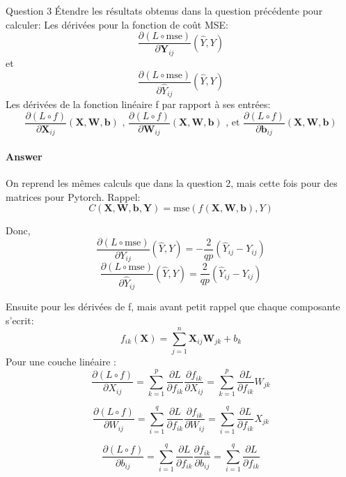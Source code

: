 \documentclass[12pt,a4paper]{article}
\begin{document}
\begin{section}{Question 3}
Étendre les résultats obtenus dans la question précédente pour calculer: \newline
Les dérivées pour la fonction de coût MSE:
\[
\frac{\partial (L\circ \text{mse})}{\partial \mathbf{Y}_{ij}}(\hat{Y}, Y)
\]
et
\[\frac{\partial (L\circ \text{mse})}{\partial \hat{Y}_{ij}}(\hat{Y}, Y)\]
Les dérivées de la fonction linéaire f par rapport à ses entrées:
\[
\frac{\partial (L\circ f)}{\partial \mathbf{X}_{ij}}(\mathbf{X}, \mathbf{W}, \mathbf{b}) \text{ , }
\frac{\partial (L\circ f)}{\partial \mathbf{W}_{ij}}(\mathbf{X}, \mathbf{W}, \mathbf{b}) \text{ , et }
\frac{\partial (L\circ f)}{\partial \mathbf{b}_{ij}}(\mathbf{X}, \mathbf{W}, \mathbf{b})
\]

\paragraph{Answer}
On reprend les mêmes calculs que dans la question 2, mais cette fois pour des matrices pour Pytorch.
Rappel:
\[
C(\mathbf{X}, \mathbf{W}, \mathbf{b}, \mathbf{Y}) = \text{mse}(f(\mathbf{X}, \mathbf{W}, \mathbf{b}), Y)
\]

Donc,
\[
\frac{\partial (L \circ \text{mse})}{\partial Y_{ij}}(\hat{Y}, Y) = -\frac{2}{qp} (\hat{Y}_{ij} - Y_{ij})
\] 
\[
\frac{\partial (L \circ \text{mse})}{\partial \hat{Y}_{ij}}(\hat{Y}, Y) = \frac{2}{qp} (\hat{Y}_{ij} - Y_{ij})
\] 

Ensuite pour les dérivées de f, mais avant petit rappel que chaque composante s'ecrit:
\[
f_{ik}(\mathbf{X}) = \sum_{j=1}^{n} \mathbf{X}_{ij} \mathbf{W}_{jk} + b_k
\]
Pour une couche linéaire :  
\[
\frac{\partial (L\circ f)}{\partial X_{ij}} = \sum_{k=1}^{p} \frac{\partial L}{\partial f_{ik}} \frac{\partial f_{ik}}{\partial X_{ij}} = \sum_{k=1}^{p} \frac{\partial L}{\partial f_{ik}} W_{jk}
\]

\[
\frac{\partial (L\circ f)}{\partial W_{ij}} = \sum_{i=1}^{q} \frac{\partial L}{\partial f_{ik}} \frac{\partial f_{ik}}{\partial W_{ij}} = \sum_{i=1}^{q} \frac{\partial L}{\partial f_{ik}} X_{jk}
\]

\[
\frac{\partial (L\circ f)}{\partial b_{ij}} = \sum_{i=1}^{q} \frac{\partial L}{\partial f_{ik}} \frac{\partial f_{ik}}{\partial b_{ij}} = \sum_{i=1}^{q} \frac{\partial L}{\partial f_{ik}} 
\]


\end{section}
\end{document}
